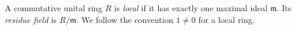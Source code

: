 
A commutative unital ring $R$ is \emph{local} if it has exactly one maximal ideal $\mathfrak m$. Its \emph{residue field} is $R/\mathfrak m$. We follow the convention $1\ne0$ for a local ring.
